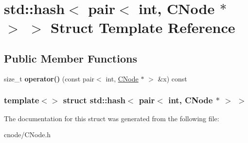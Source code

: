 \hypertarget{structstd_1_1hash_3_01pair_3_01int_00_01CNode_01_5_01_4_01_4}{\section{std\-:\-:hash$<$ pair$<$ int, \-C\-Node $\ast$ $>$ $>$ \-Struct \-Template \-Reference}
\label{structstd_1_1hash_3_01pair_3_01int_00_01CNode_01_5_01_4_01_4}
}
\subsection*{\-Public \-Member \-Functions}
\begin{DoxyCompactItemize}
\item 
\hypertarget{structstd_1_1hash_3_01pair_3_01int_00_01CNode_01_5_01_4_01_4_a050889103cade857526870c1aea3151b}{size\-\_\-t {\bfseries operator()} (const pair$<$ int, \hyperlink{classCNode}{\-C\-Node} $\ast$ $>$ \&x) const }\label{structstd_1_1hash_3_01pair_3_01int_00_01CNode_01_5_01_4_01_4_a050889103cade857526870c1aea3151b}

\end{DoxyCompactItemize}
\subsubsection*{template$<$$>$ struct std\-::hash$<$ pair$<$ int, C\-Node $\ast$ $>$ $>$}



\-The documentation for this struct was generated from the following file\-:\begin{DoxyCompactItemize}
\item 
cnode/\-C\-Node.\-h\end{DoxyCompactItemize}
